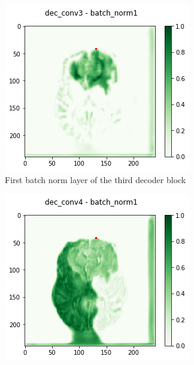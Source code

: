 \begin{figure}[H]
    \begin{subfigure}{.33\textwidth}
        \centering
        \includegraphics[width=\linewidth]{chapters/04_segmentation/images/grad_cam_30.png}
        \caption{First batch norm layer of the third decoder block}
    \end{subfigure}%
    \begin{subfigure}{.33\textwidth}
        \centering
        \includegraphics[width=\linewidth]{chapters/04_segmentation/images/grad_cam_34.png}

\end{subfigure}
\end{figure}
